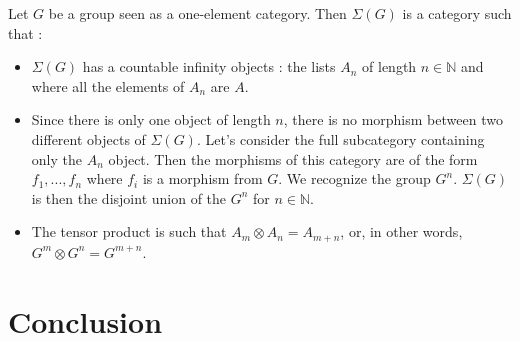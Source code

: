 \documentclass{report}
\begin{document}
Let $G$ be a group seen as a one-element category. Then $ \Sigma(G)$ is a category such that : 
\begin{itemize}
    \item $\Sigma(G)$ has a countable infinity objects : the lists $A_n$ of length $n \in \mathbb{N}$ and where all the elements of $A_n$ are $A$.
    \item Since there is only one object of length $n$, there is no morphism between two different objects of $\Sigma(G)$. Let's consider the full subcategory containing only the $A_n$ object. Then the morphisms of this category are of the form $f_1,...,f_n$ where $f_i$ is a morphism from $G$. We recognize the group $G^{n}$. $\Sigma (G)$ is then the disjoint union of the $G^{n}$ for $ n\in\mathbb{N}$.
    \item  The tensor product is such that  $A_m \otimes A_n = A_{m+n}$, or, in other words, $G^m \otimes G^n = G^{m+n}$. 
\end{itemize}



\chapter{Conclusion}

\newpage



\end{document}
